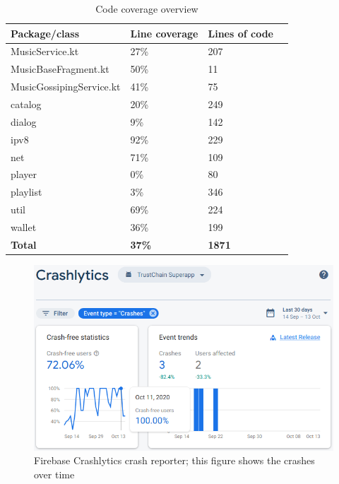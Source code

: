 \begin{table}[]
\centering
\begin{tabular}{|l|l|l|l|}
\hline
\textbf{Package/class} & \textbf{Line coverage} & \textbf{Lines of code} \\ \hline
MusicService.kt        & 27\%   & 207         \\ \hline
MusicBaseFragment.kt   & 50\%  & 11            \\ \hline
MusicGossipingService.kt & 41\% & 75          \\ \hline
catalog                & 20\% & 249          \\ \hline
dialog                 & 9\% & 142          \\ \hline
ipv8                   & 92\% & 229          \\ \hline
net                    & 71\% & 109          \\ \hline
player                 & 0\% & 80             \\ \hline
playlist               & 3\% & 346           \\ \hline
util                   & 69\% & 224              \\ \hline
wallet                 & 36\% & 199           \\ \hline
\textbf{Total} & \textbf{37\%} & \textbf{1871} \\ \hline
\end{tabular}
\caption{Code coverage overview}
\label{tab:code-cov}
\end{table}

\begin{figure}
    \includegraphics[width=0.7\linewidth]{implementation/firebase-crashlytics.png}
    \caption{Firebase Crashlytics crash reporter; this figure shows the crashes over time}
    \label{fig:firebase-crashlytics}
\end{figure}